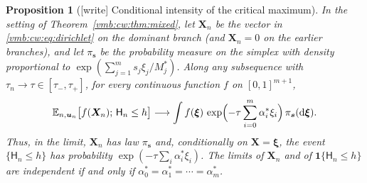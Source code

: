 \documentclass[11pt,a4paper]{article}
\numberwithin{equation}{section}
\newtheorem{proposition}[theorem]{Proposition}
\theoremstyle{definition}\newtheorem{definition}[theorem]{Definition}
\theoremstyle{remark}\newtheorem{remark}[theorem]{Remark}
\newcommand{\E}{\mathbb E}
\newcommand{\dd}{\mathrm d}
\begin{document}
\begin{proposition}[{[write]} Conditional intensity of the critical maximum]
\label{vmb:cw:prop:conditional}
In the setting of Theorem~\ref{vmb:cw:thm:mixed}, let $\bm X_n$ be the vector
in \eqref{vmb:cw:eq:dirichlet} on the dominant branch (and $\bm X_n=0$ on the
earlier branches), and let $\pi_{\bm s}$ be the probability measure on the
simplex with density proportional to $\exp(\sum_{j=1}^ms_j\xi_j/M_j^*)$.
Along any subsequence with $\tau_n\to\tau\in[\tau_-,\tau_+]$, for every
continuous function $f$ on $[0,1]^{m+1}$,
\begin{equation}\label{vmb:cw:eq:conditional}
 \E_{n,\bm u_n}\bigl[f(\bm X_n);\,\mathsf H_n\le h\bigr]
 \longrightarrow\int f(\bm\xi)\,
 \exp\Bigl(-\tau\sum_{i=0}^m\alpha_i^*\xi_i\Bigr)\,\pi_{\bm s}(\dd\bm\xi).
\end{equation}
Thus, in the limit, $\bm X_n$ has law $\pi_{\bm s}$ and, conditionally on
$\bm X=\bm\xi$, the event $\{\mathsf H_n\le h\}$ has probability
$\exp(-\tau\sum_i\alpha_i^*\xi_i)$. The limits of $\bm X_n$ and of
$\mathbf 1\{\mathsf H_n\le h\}$ are independent if and only if
$\alpha_0^*=\alpha_1^*=\cdots=\alpha_m^*$.
\end{proposition}
\end{document}
